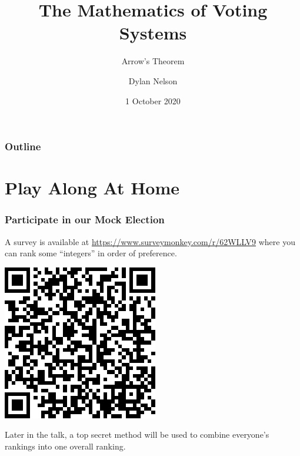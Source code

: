 \documentclass{beamer}
\title[Voting Sytems]{The Mathematics of Voting Systems}
\subtitle{Arrow's Theorem}
\author{Dylan Nelson}
\institute[SUMS]{Stellenbosch University Mathematics Society}
\date{1 October 2020}
\begin{document}
    \frame{\titlepage}

    \begin{frame}
        \frametitle{Outline}
        \begin{multicols}{2}
            \tableofcontents
        \end{multicols}
    \end{frame}

    \section{Play Along At Home}
    \begin{frame}
        \frametitle{Participate in our Mock Election}
    
        A survey is available at \url{https://www.surveymonkey.com/r/62WLLV9} where you can rank some ``integers'' in order of preference.

        \begin{center}
            \includegraphics[width=0.3\linewidth]{surveymonkey_qr_code.png}
        \end{center}

        Later in the talk, a top secret method will be used to combine everyone's rankings into one overall ranking.
    
    \end{frame}
\end{document}
